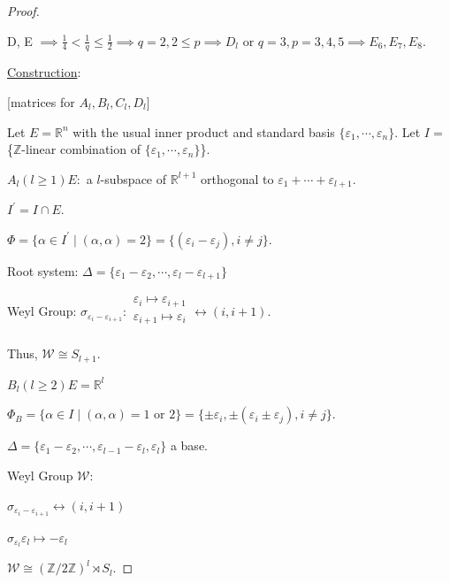 \documentclass{article}
\theoremstyle{definition}
\begin{document}
\begin{proof}
\begin{enumerate}[label=\arabic*)]
    D, E \(\implies \frac{1}{4} < \frac{1}{q} \leq \frac{1}{2} \implies q = 2, 2 \leq p \implies D_l\) or \(q=3, p = 3,4,5 \implies E_6, E_7, E_8\).

    \end{enumerate} 
    
    \underline{Construction}:

    [matrices for \(A_l, B_l, C_l, D_l\)]

    Let \(E = \mathbb{R}^n\) with the usual inner product and standard basis \(\{ \varepsilon_1, \cdots , \varepsilon_n \}\). Let \(I =\) \{\(\mathbb{Z}\)-linear combination of \(\{ \varepsilon_1, \cdots ,\varepsilon_n \}\)\}.
    
    \(A_l (l \geq 1) E:\) a \(l\)-subspace of \(\mathbb{R}^{l+1}\) orthogonal to \(\varepsilon_1 + \cdots + \varepsilon_{l+1}\).
    
    \(I^{\prime} = I \cap E\).

    \(\Phi = \{ \alpha \in I^{\prime} \mid (\alpha, \alpha) = 2 \} = \{ (\varepsilon_i - \varepsilon_j), i \neq j\}\).

    Root system: \(\Delta = \{ \varepsilon_1 - \varepsilon_2, \cdots , \varepsilon_l - \varepsilon_{l+1} \} \) 

    Weyl Group: \(\sigma_{\varepsilon_i - \varepsilon_{i+1}}: \begin{matrix}
        \varepsilon_i \mapsto \varepsilon_{i+1}  \\
        \varepsilon_{i+1} \mapsto \varepsilon_i   \\
    \end{matrix} \leftrightarrow (i, i+1) \).
    
    Thus, \(\mathcal{W} \cong S_{l+1}\).

    \(B_l(l \geq 2) E = \mathbb{R}^l\)

    \(\Phi_B = \{ \alpha \in I \mid (\alpha , \alpha) = 1 \text{ or } 2 \} = \{ \pm \varepsilon_i, \pm (\varepsilon_i \pm \varepsilon_j), i \neq j \}\).

    \(\Delta = \{ \varepsilon_1 - \varepsilon_2 , \cdots , \varepsilon_{l-1} - \varepsilon_l, \varepsilon_l \} \) a base.

    Weyl Group \(\mathcal{W}\):

    \(\sigma_{\varepsilon_i - \varepsilon_{i+1}} \leftrightarrow (i, i+1)\)
    
    \(\sigma_{\varepsilon_l} \varepsilon_l \mapsto - \varepsilon_l \)
    
    \(\mathcal{W} \cong (\mathbb{Z} / 2\mathbb{Z})^l \rtimes S_l\).


\end{proof}
\end{document}
